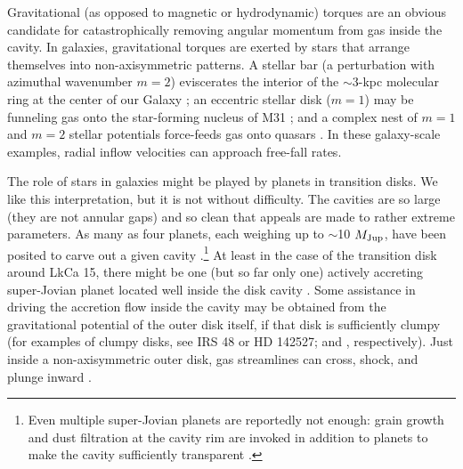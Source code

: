 Gravitational (as opposed to magnetic or hydrodynamic) torques are an obvious 
candidate for catastrophically removing angular momentum from gas inside the 
cavity.  In galaxies, gravitational torques are exerted by stars that arrange 
themselves into non-axisymmetric patterns.  A stellar bar (a perturbation with
azimuthal wavenumber $m=2$) eviscerates the interior of the $\sim$3-kpc 
molecular ring at the center of our Galaxy \citep{Schwarz81,Binney91}; an 
eccentric stellar disk ($m=1$) may be funneling gas onto the star-forming 
nucleus of M31 \citep{Chang07}; and a complex nest of $m=1$ and $m=2$ stellar 
potentials force-feeds gas onto quasars \citep{Shlosman89,Hopkins11}.  In these 
galaxy-scale examples, radial inflow velocities can approach free-fall rates.

The role of stars in galaxies might be played by planets in transition disks.  
We like this interpretation, but it is not without difficulty.  The cavities 
are so large (they are not annular gaps) and so clean that appeals are made to 
rather extreme parameters.  As many as four planets, each weighing up to 
$\sim$10 $M_{\rm Jup}$, have been posited to carve out a given cavity 
\citep{Zhu11,Dodson11}.\footnote{Even multiple super-Jovian planets are 
reportedly not enough: grain growth and dust filtration at the cavity rim are 
invoked in addition to planets to make the cavity sufficiently transparent 
\citep{Zhu11,Dong12}.}  At least in the case of the transition disk around LkCa 
15, there might be one (but so far only one) actively accreting super-Jovian 
planet located well inside the disk cavity \citep{Kraus12}.  Some assistance in 
driving the accretion flow inside the cavity may be obtained from the 
gravitational potential of the outer disk itself, if that disk is sufficiently 
clumpy (for examples of clumpy disks, see IRS 48 or HD 142527; 
\citealt{vandermarel13} and \citealt{casassus13}, respectively).  Just inside a 
non-axisymmetric outer disk, gas streamlines can cross, shock, and plunge 
inward \citep[e.g.,][]{pac77}.

